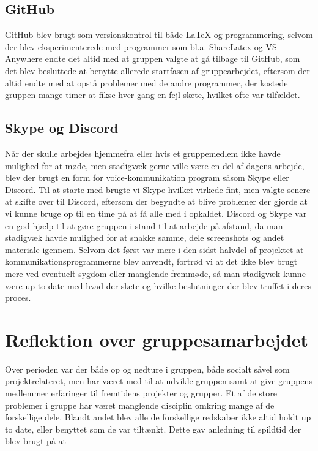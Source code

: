 \subsection{GitHub}\label{GitHub}
GitHub blev brugt som versionskontrol til både LaTeX og programmering, selvom der blev eksperimenterede med programmer som bl.a. ShareLatex og VS Anywhere endte det altid med at gruppen valgte at gå tilbage til GitHub, som det blev besluttede at benytte allerede startfasen af gruppearbejdet, eftersom der altid endte med at opstå problemer med de andre programmer, der kostede gruppen mange timer at fikse hver gang en fejl skete, hvilket ofte var tilfældet.

\subsection{Skype og Discord}\label{SkypeOgDiscord}
Når der skulle arbejdes hjemmefra eller hvis et gruppemedlem ikke havde mulighed for at møde, men stadigvæk gerne ville være en del af dagens arbejde, blev der brugt en form for voice-kommunikation program såsom Skype eller Discord. Til at starte med brugte vi Skype hvilket virkede fint, men valgte senere at skifte over til Discord, eftersom der begyndte at blive problemer der gjorde at vi kunne bruge op til en time på at få alle med i opkaldet. Discord og Skype var en god hjælp til at gøre gruppen i stand til at arbejde på afstand, da man stadigvæk havde mulighed for at snakke samme, dele screenshots og andet materiale igennem. Selvom det først var mere i den sidst halvdel af projektet at kommunikationsprogrammerne blev anvendt, fortrød vi at det ikke blev brugt mere ved eventuelt sygdom eller manglende fremmøde, så man stadigvæk kunne være up-to-date med hvad der skete og hvilke beslutninger der blev truffet i deres proces.  

\section{Reflektion over gruppesamarbejdet}\label{Reflektion-over-gruppesamarbejdet}

Over perioden var der både op og nedture i gruppen, både socialt såvel som projektrelateret, men har været med til at udvikle gruppen samt at give gruppens medlemmer erfaringer til fremtidens projekter og grupper. Et af de store problemer i gruppe har været manglende disciplin omkring mange af de forskellige dele. Blandt andet blev alle de forskellige redskaber ikke altid holdt up to date, eller benyttet som de var tiltænkt. Dette gav anledning til spildtid der blev brugt på at 